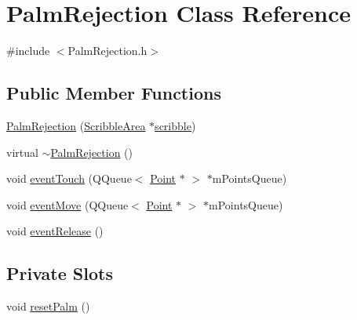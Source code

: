 \hypertarget{classPalmRejection}{
\section{PalmRejection Class Reference}
\label{classPalmRejection}
}


{\ttfamily \#include $<$PalmRejection.h$>$}\subsection*{Public Member Functions}
\begin{DoxyCompactItemize}
\item 
\hyperlink{classPalmRejection_abe50f2e20ae5dc116a617d034d14529b}{PalmRejection} (\hyperlink{classScribbleArea}{ScribbleArea} $\ast$\hyperlink{classPalmRejection_a8aceeaa0e01f8c54e89456567eec6ed7}{scribble})
\item 
virtual \hyperlink{classPalmRejection_a0ae1ed25302f025d6239d77c6c7ffacb}{$\sim$PalmRejection} ()
\item 
void \hyperlink{classPalmRejection_adbd14c99a19d97f2116d1dbc837e4349}{eventTouch} (QQueue$<$ \hyperlink{classPoint}{Point} $\ast$ $>$ $\ast$mPointsQueue)
\item 
void \hyperlink{classPalmRejection_ad9bc814545bdb875800c6c4558024310}{eventMove} (QQueue$<$ \hyperlink{classPoint}{Point} $\ast$ $>$ $\ast$mPointsQueue)
\item 
void \hyperlink{classPalmRejection_a855092ea55c2b5f1025b988d9e77d992}{eventRelease} ()
\end{DoxyCompactItemize}
\subsection*{Private Slots}
\begin{DoxyCompactItemize}
\item 
void \hyperlink{classPalmRejection_ae82ede159f4d99bad07924c3fb1387ee}{resetPalm} ()
\end{DoxyCompactItemize}

